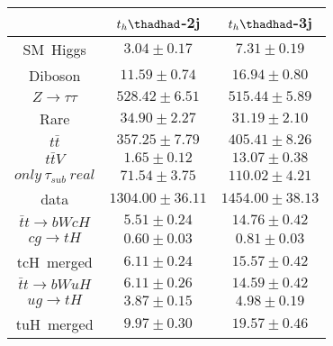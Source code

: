 \centering
\begin{tabular}{ccc} \toprule\toprule
 & $t_{h}\thadhad$-2j & $t_{h}\thadhad$-3j\\\midrule
SM~Higgs & $3.04\pm0.17$ & $7.31\pm0.19$\\
Diboson & $11.59\pm0.74$ & $16.94\pm0.80$\\
$Z\to\tau\tau$ & $528.42\pm6.51$ & $515.44\pm5.89$\\
Rare & $34.90\pm2.27$ & $31.19\pm2.10$\\
$t\bar{t}$ & $357.25\pm7.79$ & $405.41\pm8.26$\\
$t\bar{t}V$ & $1.65\pm0.12$ & $13.07\pm0.38$\\
$only~\tau_{sub}~real$ & $71.54\pm3.75$ & $110.02\pm4.21$\\
data & $1304.00\pm36.11$ & $1454.00\pm38.13$\\
$\bar{t}t\to bWcH$ & $5.51\pm0.24$ & $14.76\pm0.42$\\
$cg\to tH$ & $0.60\pm0.03$ & $0.81\pm0.03$\\
tcH~merged & $6.11\pm0.24$ & $15.57\pm0.42$\\
$\bar{t}t\to bWuH$ & $6.11\pm0.26$ & $14.59\pm0.42$\\
$ug\to tH$ & $3.87\pm0.15$ & $4.98\pm0.19$\\
tuH~merged & $9.97\pm0.30$ & $19.57\pm0.46$\\
\bottomrule\bottomrule
\end{tabular}